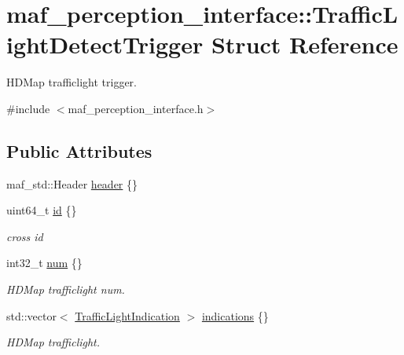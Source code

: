 \hypertarget{structmaf__perception__interface_1_1TrafficLightDetectTrigger}{}\section{maf\+\_\+perception\+\_\+interface\+:\+:Traffic\+Light\+Detect\+Trigger Struct Reference}
\label{structmaf__perception__interface_1_1TrafficLightDetectTrigger}


H\+D\+Map trafficlight trigger.  




{\ttfamily \#include $<$maf\+\_\+perception\+\_\+interface.\+h$>$}

\subsection*{Public Attributes}
\begin{DoxyCompactItemize}
\item 
maf\+\_\+std\+::\+Header \hyperlink{structmaf__perception__interface_1_1TrafficLightDetectTrigger_a0b2058ef8d683759003b3e47040d05dc}{header} \{\}
\item 
uint64\+\_\+t \hyperlink{structmaf__perception__interface_1_1TrafficLightDetectTrigger_af9e02872bdf1a258db0266c29393c627}{id} \{\}
\begin{DoxyCompactList}\small\item\em cross id \end{DoxyCompactList}\item 
int32\+\_\+t \hyperlink{structmaf__perception__interface_1_1TrafficLightDetectTrigger_aa262f653aaec9d6bcedcbf5ffe8653a2}{num} \{\}
\begin{DoxyCompactList}\small\item\em H\+D\+Map trafficlight num. \end{DoxyCompactList}\item 
std\+::vector$<$ \hyperlink{structmaf__perception__interface_1_1TrafficLightIndication}{Traffic\+Light\+Indication} $>$ \hyperlink{structmaf__perception__interface_1_1TrafficLightDetectTrigger_a4247b942d1f95c32ba44665af02f54b2}{indications} \{\}
\begin{DoxyCompactList}\small\item\em H\+D\+Map trafficlight. \end{DoxyCompactList}\end{DoxyCompactItemize}


